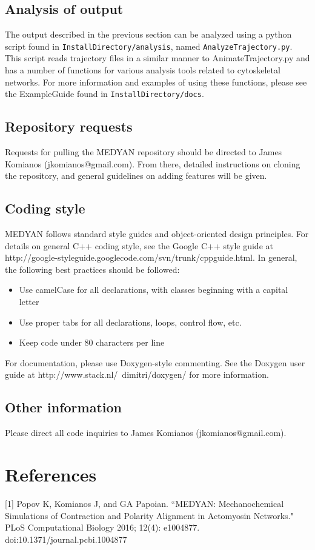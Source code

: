 \documentclass[11pt, oneside]{article}   	%
\begin{document}
\subsection{Analysis of output}

The output described in the previous section can be analyzed using a python script found in \texttt{InstallDirectory/analysis}, named \texttt{AnalyzeTrajectory.py}. This script reads trajectory files in a similar manner to AnimateTrajectory.py and has a number of functions for various analysis tools related to cytoskeletal networks. For more information and examples of using these functions, please see the ExampleGuide found in \texttt{InstallDirectory/docs}.

\subsection{Repository requests}

Requests for pulling the MEDYAN repository should be directed to James Komianos (jkomianos@gmail.com). From there, detailed instructions on cloning the repository, and general guidelines on adding features will be given.

\subsection{Coding style}

MEDYAN follows standard style guides and object-oriented design principles. For details on general C++ coding style, see the Google C++ style guide at http://google-styleguide.googlecode.com/svn/trunk/cppguide.html. In general, the following best practices should be followed:

\begin{itemize}

\item Use camelCase for all declarations, with classes beginning with a capital letter
\item Use proper tabs for all declarations, loops, control flow, etc.
\item Keep code under 80 characters per line

\end{itemize}

\noindent For documentation, please use Doxygen-style commenting. See the Doxygen user guide at 
http://www.stack.nl/~dimitri/doxygen/ for more information.

\subsection{Other information}

Please direct all code inquiries to James Komianos (jkomianos@gmail.com).

\section{References}

[1] Popov K, Komianos J, and GA Papoian. ``MEDYAN: Mechanochemical Simulations 
\indent of Contraction and Polarity Alignment in Actomyosin Networks." PLoS Computational \indent Biology 2016; 12(4): e1004877. doi:10.1371/journal.pcbi.1004877
\end{document}
